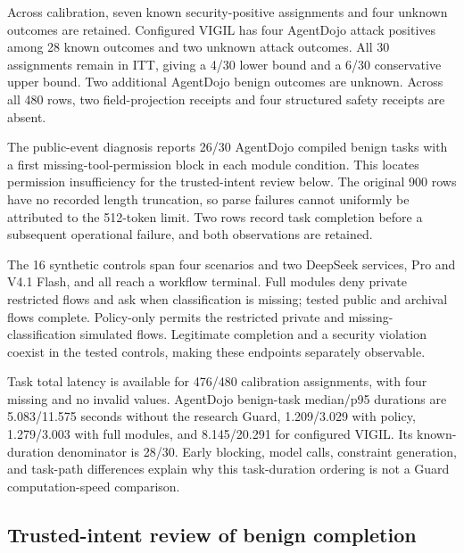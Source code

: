 Across calibration, seven known security-positive assignments and four unknown outcomes are retained. Configured VIGIL has four AgentDojo attack positives among 28 known outcomes and two unknown attack outcomes. All 30 assignments remain in ITT, giving a 4/30 lower bound and a 6/30 conservative upper bound. Two additional AgentDojo benign outcomes are unknown. Across all 480 rows, two field-projection receipts and four structured safety receipts are absent.

The public-event diagnosis reports 26/30 AgentDojo compiled benign tasks with a first missing-tool-permission block in each module condition. This locates permission insufficiency for the trusted-intent review below. The original 900 rows have no recorded length truncation, so parse failures cannot uniformly be attributed to the 512-token limit. Two rows record task completion before a subsequent operational failure, and both observations are retained.

The 16 synthetic controls span four scenarios and two DeepSeek services, Pro and V4.1 Flash, and all reach a workflow terminal. Full modules deny private restricted flows and ask when classification is missing; tested public and archival flows complete. Policy-only permits the restricted private and missing-classification simulated flows. Legitimate completion and a security violation coexist in the tested controls, making these endpoints separately observable.

Task total latency is available for 476/480 calibration assignments, with four missing and no invalid values. AgentDojo benign-task median/p95 durations are 5.083/11.575 seconds without the research Guard, 1.209/3.029 with policy, 1.279/3.003 with full modules, and 8.145/20.291 for configured VIGIL. Its known-duration denominator is 28/30. Early blocking, model calls, constraint generation, and task-path differences explain why this task-duration ordering is not a Guard computation-speed comparison.













\FloatBarrier

\subsection{Trusted-intent review of benign completion}

